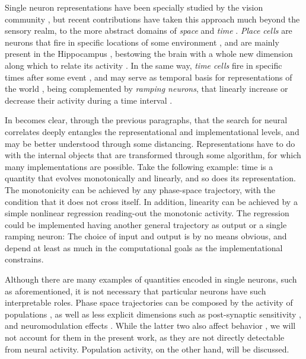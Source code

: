     Single neuron representations have been specially studied by the vision community \cite{deyoe1988concurrent,bell1997independent,ito2004representation,lee2008sparse}, but recent contributions have taken this approach much beyond the sensory realm, to the more abstract domains of \textit{space} and \textit{time} \cite{eichenbaum2014time}. \textit{Place cells} are neurons that fire in specific locations of some environment \cite{foster2006reverse}, and are mainly present in the Hippocampus \cite{o1979review}, bestowing the brain with a whole new dimension along which to relate its activity \cite{eichenbaum2014time}. In the same way, \textit{time cells} fire in specific times after some event \cite{tiganj2016sequential, eichenbaum2014time}, and may serve as temporal basis for representations of the world \cite{ludvig2008stimulus}, being complemented by \textit{ramping neurons}, that linearly increase or decrease their activity during a time interval \cite{morrison2009convergence, kim2013neural, tiganj2016sequential, parker2016timing}.
    
    In becomes clear, through the previous paragraphs, that the search for neural correlates deeply entangles the representational and implementational levels, and may be better understood through some distancing. Representations have to do with the internal objects that are transformed through some algorithm, for which many implementations are possible. Take the following example: time is a quantity that evolves monotonically and linearly, and so does its representation. The monotonicity can be achieved by any phase-space trajectory, with the condition that it does not cross itself. In addition, linearity can be achieved by a simple nonlinear regression reading-out the monotonic activity. The regression could be implemented having another general trajectory as output \cite{} or a single ramping neuron: The choice of input and output is by no means obvious, and depend at least as much in the computational goals as the implementational constrains.
    
    Although there are many examples of quantities encoded in single neurons, such as aforementioned, it is not necessary that particular neurons have such interpretable roles. Phase space trajectories can be composed by the activity of populations \cite{shamir2014emerging, quiroga2009extracting}, as well as less explicit dimensions such as post-synaptic sensitivity \cite{motanis2018short}, and neuromodulation effects \cite{friston2009free, friston2010free}. While the latter two also affect behavior \cite{wolff2017dynamic}, we will not account for them in the present work, as they are not directly detectable from neural activity. Population activity, on the other hand, will be discussed.
    
